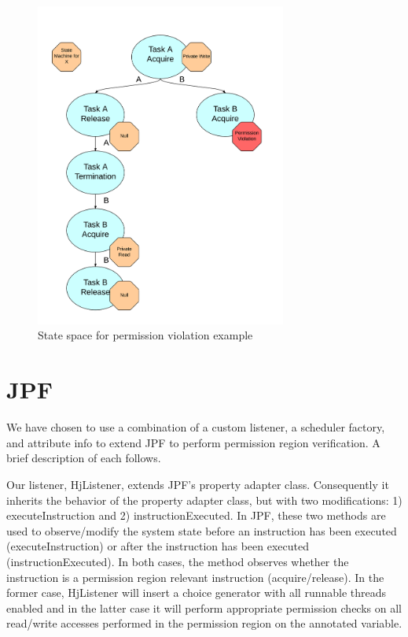 \begin{figure}[t]
\centering
\includegraphics[width=3.25in]{../figs/permission-violation-state}
\caption{State space for permission violation example}
\label{fig:permission-violation-state}
\end{figure}


\section{JPF}

We have chosen to use a combination of a custom listener, a scheduler factory,
and attribute info to extend JPF to perform permission region verification. 
%
A brief description of each  follows.

Our listener, HjListener, extends JPF's property adapter class. Consequently it
inherits the behavior of the property adapter class, but with two modifications: 1)
executeInstruction and 2) instructionExecuted.
%
In JPF, these two methods are used to observe/modify the system state before an
instruction has been executed (executeInstruction) or after the instruction has
been executed (instructionExecuted). 
%
In both cases, the method observes whether the instruction is a permission
region relevant instruction (acquire/release).
%
In the former case, HjListener will insert a choice generator with all runnable threads enabled and in the latter case it will perform appropriate permission checks on all read/write accesses performed in the permission region on the annotated variable.
%

